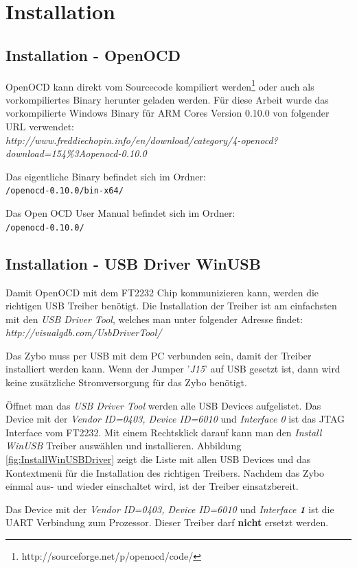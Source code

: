 \section{Installation}
\subsection{Installation - OpenOCD}
OpenOCD kann direkt vom Sourcecode kompiliert werden\footnote{http://sourceforge.net/p/openocd/code/} oder auch als vorkompiliertes Binary herunter geladen werden.
Für diese Arbeit wurde das vorkompilierte Windows Binary für ARM Cores Version 0.10.0 von folgender URL verwendet:\\
\textit{http://www.freddiechopin.info/en/download/category/4-openocd?download=154\%3Aopenocd-0.10.0}

Das eigentliche Binary befindet sich im Ordner:\\
\texttt{/openocd-0.10.0/bin-x64/} 

Das Open OCD User Manual\cite{bib:OpenOCDDoku} befindet sich im Ordner:\\
\texttt{/openocd-0.10.0/} 


\subsection{Installation - USB Driver WinUSB}
Damit OpenOCD mit dem FT2232 Chip kommunizieren kann, werden die richtigen USB Treiber benötigt.
Die Installation der Treiber ist am einfachsten mit den \textit{USB Driver Tool}, welches man unter folgender Adresse findet:\\
\textit{http://visualgdb.com/UsbDriverTool/}

Das Zybo muss per USB mit dem PC verbunden sein, damit der Treiber installiert werden kann.
Wenn der Jumper '\textit{J15}' auf USB gesetzt ist, dann wird keine zusätzliche Stromversorgung für das Zybo benötigt.

Öffnet man das \textit{USB Driver Tool} werden alle USB Devices aufgelistet.
Das Device mit der \textit{Vendor ID=0403, Device ID=6010} und \textit{Interface 0} ist das JTAG Interface vom FT2232.
Mit einem Rechtsklick darauf kann man den \textit{Install WinUSB} Treiber auswählen und installieren.
Abbildung \ref{fig:InstallWinUSBDriver} zeigt die Liste mit allen USB Devices und das Kontextmenü für die Installation des richtigen Treibers.
Nachdem das Zybo einmal aus- und wieder einschaltet wird, ist der Treiber einsatzbereit.

Das Device mit der \textit{Vendor ID=0403, Device ID=6010} und \textit{Interface \textbf{1}} ist die UART Verbindung zum Prozessor.
Dieser Treiber darf \textbf{nicht} ersetzt werden.

